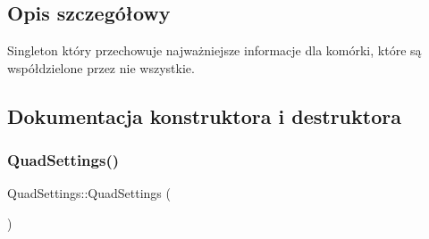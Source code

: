 \subsection{Opis szczegółowy}
Singleton który przechowuje najważniejsze informacje dla komórki, które są współdzielone przez nie wszystkie. 

\subsection{Dokumentacja konstruktora i destruktora}
\mbox{\label{class_quad_settings_a2c541d4338024c495bef33ff8b990a59}} 
\subsubsection{\texorpdfstring{Quad\+Settings()}{QuadSettings()}}
{\footnotesize\ttfamily Quad\+Settings\+::\+Quad\+Settings (\begin{DoxyParamCaption}{ }\end{DoxyParamCaption})\hspace{0.3cm}{\ttfamily [private]}}

